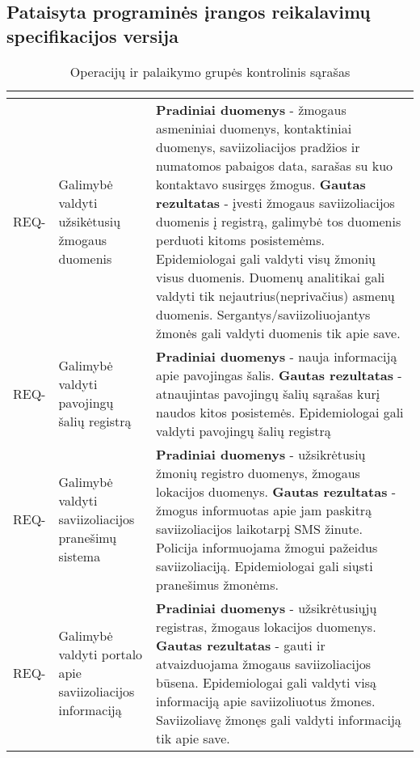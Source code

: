 \documentclass{VUMIFPSkursinis}
\newcounter{counter}
\newcommand{\reqCode}{%
	 \stepcounter{counter}%
	\color{blue} REQ-\thecounter}
\begin{document}
\subsection{Pataisyta programinės įrangos reikalavimų specifikacijos versija}
\begin{center}
	\small
	\begin{longtable}{|C{2cm}|L{5cm}|L{8cm}|}
		\caption{Operacijų ir palaikymo grupės kontrolinis sąrašas}
		\label{table:EmployeeSalary}
		\\ \hline
		                                 &
		                     &
		\\ \hline
		\reqCode &
		Galimybė valdyti užsikėtusių žmogaus duomenis&
		\textbf{Pradiniai duomenys} - žmogaus asmeniniai duomenys, kontaktiniai duomenys, saviizoliacijos pradžios ir numatomos pabaigos data, sarašas su kuo kontaktavo susirgęs žmogus.
		\textbf{Gautas rezultatas} - įvesti žmogaus saviizoliacijos duomenis į registrą, galimybė tos duomenis perduoti kitoms posistemėms. 
		Epidemiologai gali valdyti visų žmonių visus duomenis. Duomenų analitikai gali valdyti tik nejautrius(neprivačius) asmenų duomenis. Sergantys/saviizoliuojantys žmonės gali valdyti duomenis tik apie save.
		\\ \hline
		\reqCode &
		Galimybė valdyti pavojingų šalių registrą&
		\textbf{Pradiniai duomenys} - nauja informaciją apie pavojingas šalis. \textbf{Gautas rezultatas} - atnaujintas pavojingų šalių sąrašas kurį naudos kitos posistemės.
		Epidemiologai gali valdyti pavojingų šalių registrą		
		\\ \hline	
		\reqCode &
		Galimybė valdyti saviizoliacijos pranešimų sistema&
		\textbf{Pradiniai duomenys} - užsikrėtusių žmonių registro duomenys, žmogaus lokacijos duomenys. \textbf{Gautas rezultatas} - žmogus informuotas apie jam paskitrą saviizoliacijos laikotarpį SMS žinute. Policija informuojama žmogui pažeidus saviizoliaciją.
		Epidemiologai gali siųsti pranešimus žmonėms.
		\\ \hline	
		\reqCode &
		Galimybė valdyti portalo apie saviizoliacijos informaciją&
		\textbf{Pradiniai duomenys} - užsikrėtusiųjų registras, žmogaus lokacijos duomenys. \textbf{Gautas rezultatas} - gauti ir atvaizduojama žmogaus saviizoliacijos būsena.
		Epidemiologai gali valdyti visą informaciją apie saviizoliuotus žmones. Saviizoliavę žmonęs gali valdyti informaciją tik apie save.
		\\ \hline		

\end{longtable}
\end{center}
\end{document}
